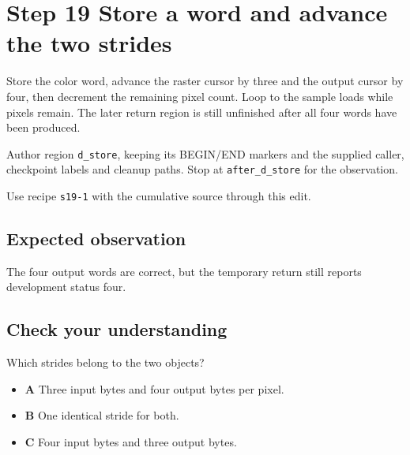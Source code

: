 \section{Step 19 Store a word and advance the two strides}\label{ppm-s19}

Store the color word, advance the raster cursor by three and the output cursor by four, then decrement the remaining pixel count. Loop to the sample loads while pixels remain. The later return region is still unfinished after all four words have been produced.

Author region \texttt{d\_store}, keeping its BEGIN/END markers and the supplied caller, checkpoint labels and cleanup paths. Stop at \texttt{after\_d\_store} for the observation.

Use recipe \texttt{s19-1} with the cumulative source through this edit.

\subsection{Expected observation}
The four output words are correct, but the temporary return still reports development status four.

\subsection{Check your understanding}
Which strides belong to the two objects?

\begin{itemize}
  \item \textbf{A} Three input bytes and four output bytes per pixel.
  \item \textbf{B} One identical stride for both.
  \item \textbf{C} Four input bytes and three output bytes.
\end{itemize}
